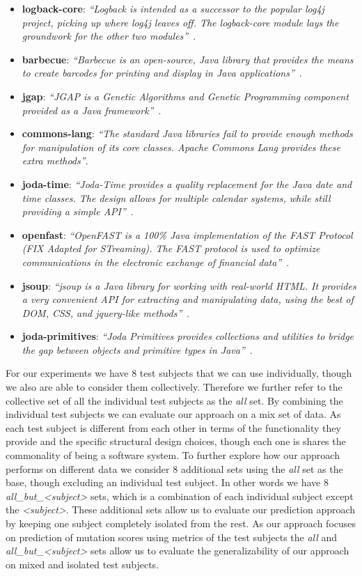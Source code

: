 \begin{itemize}
  \item \textbf{logback-core}: \emph{``Logback is intended as a successor to the popular log4j project, picking up where log4j leaves off. The logback-core module lays the groundwork for the other two modules''}~\cite{logback}.
  \item \textbf{barbecue}: \emph{``Barbecue is an open-source, Java library that provides the means to create barcodes for printing and display in Java applications''}~\cite{barbecue}.
  \item \textbf{jgap}: \emph{``JGAP is a Genetic Algorithms and Genetic Programming component provided as a Java framework''}~\cite{jgap}.
  \item \textbf{commons-lang}: \emph{``The standard Java libraries fail to provide enough methods for manipulation of its core classes. Apache Commons Lang provides these extra methods''}\cite{commons-lang}.
  \item \textbf{joda-time}: \emph{``Joda-Time provides a quality replacement for the Java date and time classes. The design allows for multiple calendar systems, while still providing a simple API''}~\cite{joda-time}.
  \item \textbf{openfast}: \emph{``OpenFAST is a 100\% Java implementation of the FAST Protocol (FIX Adapted for STreaming). The FAST protocol is used to optimize communications in the electronic exchange of financial data''}~\cite{openfast}.
  \item \textbf{jsoup}: \emph{``jsoup is a Java library for working with real-world HTML. It provides a very convenient API for extracting and manipulating data, using the best of DOM, CSS, and jquery-like methods''}~\cite{jsoup}.
  \item \textbf{joda-primitives}: \emph{``Joda Primitives provides collections and utilities to bridge the gap between objects and primitive types in Java''}~\cite{joda-primitives}.
\end{itemize}

For our experiments we have 8 test subjects that we can use individually, though we also are able to consider them collectively. Therefore we further refer to the collective set of all the individual test subjects as the \emph{all} set. By combining the individual test subjects we can evaluate our approach on a mix set of data. As each test subject is different from each other in terms of the functionality they provide and the specific structural design choices, though each one is shares the commonality of being a software system. To further explore how our approach performs on different data we consider 8 additional sets using the \emph{all} set as the base, though excluding an individual test subject. In other words we have 8 \emph{all\_but\_<subject>} sets, which is a combination of each individual subject except the \emph{<subject>}. These additional sets allow us to evaluate our prediction approach by keeping one subject completely isolated from the rest. As our approach focuses on prediction of mutation scores using metrics of the test subjects the \emph{all} and \emph{all\_but\_<subject>} sets allow us to evaluate the generalizability of our approach on mixed and isolated test subjects.


